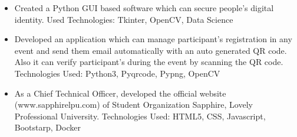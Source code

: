 \documentclass[10pt,a4paper,ragged2e]{altacv}
\begin{document}

\begin{fullwidth}
\makecvheader
\end{fullwidth}








\begin{itemize}
\item  Created a Python GUI based software which can secure people's digital identity. \newline
Used Technologies: Tkinter, OpenCV, Data Science


\end{itemize}

\divider

\begin{itemize}
\item  Developed an application which can manage participant's registration in any event and send them email automatically with an auto generated QR code. Also it can verify participant's during the event by scanning the QR code. \newline
Technologies Used: Python3, Pyqrcode, Pypng, OpenCV

\end{itemize}
\divider

\begin{itemize}
\item As a Chief Technical Officer, developed the official website (www.sapphirelpu.com) of Student Organization Sapphire, Lovely Professional University.\newline
Technologies Used: HTML5, CSS, Javascript, Bootstarp, Docker

\end{itemize}
\divider
\end{document}
